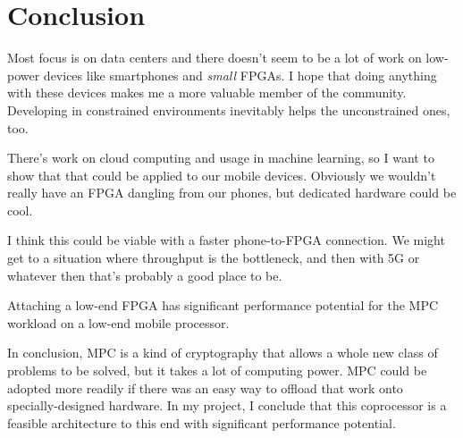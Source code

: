 \section{Conclusion}
Most focus is on data centers and there doesn't seem to be a lot of work on low-power devices like smartphones and \textit{small} FPGAs. I hope that doing anything with these devices makes me a more valuable member of the community. Developing in constrained environments inevitably helps the unconstrained ones, too.

There's work on cloud computing and usage in machine learning\cite{NeuralNets}, so I want to show that that could be applied to our mobile devices. Obviously we wouldn't really have an FPGA dangling from our phones, but dedicated hardware could be cool.

I think this could be viable with a faster phone-to-FPGA connection. We might get to a situation where throughput is the bottleneck, and then with 5G or whatever then that's probably a good place to be.

Attaching a low-end FPGA has significant performance potential for the MPC workload on a low-end mobile processor.

In conclusion, MPC is a kind of cryptography that allows a whole new class of problems to be solved, but it takes a lot of computing power. MPC could be adopted more readily if there was an easy way to offload that work onto specially-designed hardware. In my project, I conclude that this coprocessor is a feasible architecture to this end with significant performance potential.
